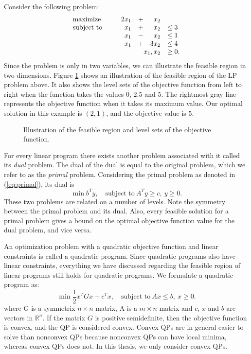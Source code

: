 Consider the following problem:
\[
\begin{array}{lcrcrl}
    \textrm{maximize}   & & 2 x_1 &+&   x_2 \\
    \textrm{subject to} & &   x_1 &+&   x_2 & \leq 3 \\
                        & &   x_1 &-&   x_2 & \leq 1 \\
                        &-&   x_1 &+& 3 x_2 & \leq 4 \\
     \multicolumn{5}{r}{x_1,x_2}            & \geq 0.
\end{array}
\]
Since the problem is only in two variables, we can illustrate the feasible region
in two dimensions. Figure \ref{fig:lpback} shows an illustration of the feasible
region of the LP problem above. It also shows the level sets of the objective
function from left to right when the function takes the values $0$, $2.5$ and
$5$. The rightmost gray line represents the objective function when it takes
its maximum value. Our optimal solution in this example is $(2,1)$, and the
objective value is $5$.

\begin{figure}[ht!]
\centering

\caption{Illustration of the feasible region and level sets of the objective
         function.}
\label{fig:lpback}
\end{figure}

For every linear program there exists another problem associated with it called
its \textit{dual} problem.
The dual of the dual is equal to the original problem, which we refer to as
the \textit{primal} problem.
Considering the primal problem as denoted in (\ref{eq:primal}), its dual is
\[
\min{b^T y},\quad \textrm{subject to}~A^T y \geq c, ~ y \geq 0.
\]
These two problems are related on a number of levels.
Note the symmetry between the primal problem and its dual.
Also, every feasible solution for a primal problem gives a bound on the optimal
objective function value for the dual problem, and vice
versa\cite{vanderbei,nocedal,boyd}.

An optimization problem with a quadratic objective function and linear constraints
is called a quadratic program. Since quadratic programs also have
linear constraints, everything we have discussed regarding the feasible region of
linear programs still holds for quadratic programs. We formulate a quadratic
program as:
\[
\min{\frac{1}{2}x^T G x + c^T x},\quad \textrm{subject to}~Ax \leq b, ~ x \geq 0.
\]
where G is a symmetrix $n \times n$ matrix, A is a $m \times n$ matrix
and $c$, $x$ and $b$ are vectors in $\mathbb{R}^n$. If the matrix $G$ is
positive semidefinite, then the objective function is convex, and the
QP is considered convex. Convex QPs are in general easier to solve than
nonconvex QPs because nonconvex QPs can have local minima, whereas
convex QPs does not. In this thesis, we only consider convex QPs.

